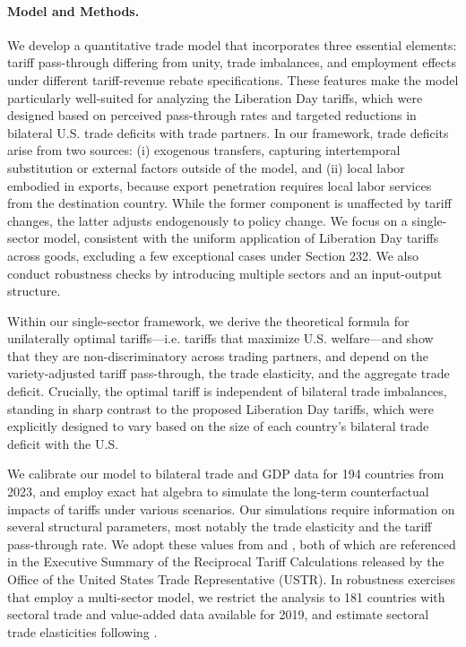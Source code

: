 \documentclass[12pt]{article}
\begin{document}
\paragraph{Model and Methods.}
We develop a quantitative trade model that incorporates three essential elements: tariff pass-through differing from unity, trade imbalances, and employment effects under different tariff-revenue rebate specifications. These features make the model particularly well-suited for analyzing the Liberation Day tariffs, which were designed based on perceived pass-through rates and targeted reductions in bilateral U.S. trade deficits with trade partners. In our framework, trade deficits arise from two sources: (i) exogenous transfers, capturing intertemporal substitution or external factors outside of the model, and (ii) local labor embodied in exports, because export penetration requires local labor services from the destination country. While the former component is unaffected by tariff changes, the latter adjusts endogenously to policy change. We focus on a single-sector model, consistent with the uniform application of Liberation Day tariffs across goods, excluding a few exceptional cases under Section 232. We also conduct robustness checks by introducing multiple sectors and an input-output structure.


Within our single-sector framework, we derive the theoretical formula for unilaterally optimal tariffs---i.e. tariffs that maximize U.S. welfare---and show that they are non-discriminatory across trading partners, and depend on the variety-adjusted tariff pass-through, the trade elasticity, and the aggregate trade deficit. Crucially, the optimal tariff is independent of bilateral trade imbalances, standing in sharp contrast to the proposed Liberation Day tariffs, which were explicitly designed to vary based on the size of each country's bilateral trade deficit with the U.S. %

We calibrate our model to bilateral trade and GDP data for 194 countries from 2023, and employ exact hat algebra to simulate the long-term counterfactual impacts of tariffs under various scenarios. Our simulations require information on several structural parameters, most notably the trade elasticity and the tariff pass-through rate. We adopt these values from \cite{simonovska2014elasticity} and \cite{cavallo2021tariff}, both of which are referenced in the Executive Summary of the Reciprocal Tariff Calculations released by the Office of the United States Trade Representative (USTR). In robustness exercises that employ a multi-sector model, we restrict the analysis to 181 countries with sectoral trade and value-added data available for 2019, and estimate sectoral trade elasticities following \citet{fontagne2022tariff}.
\end{document}
